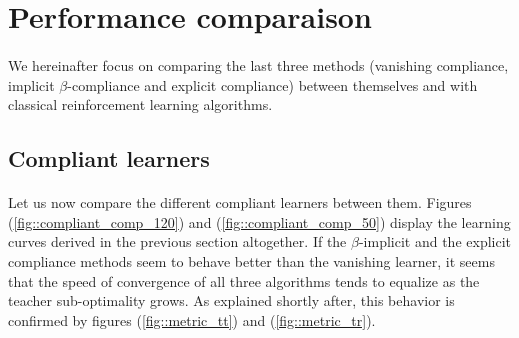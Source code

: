 \documentclass[a4paper]{report}
\begin{document}
{{		\section{Performance comparaison}
		{
			\label{sec_method_comp}
			\paragraph{} We hereinafter focus on comparing the last three methods (vanishing compliance, implicit $\beta$-compliance and explicit compliance) between themselves and with classical reinforcement learning algorithms. 
			
			\subsection{Compliant learners}
			{
				\paragraph{} Let us now compare the different compliant learners between them. Figures (\ref{fig::compliant_comp_120}) and (\ref{fig::compliant_comp_50}) display the learning curves derived in the previous section altogether. If the $\beta$-implicit and the explicit compliance methods seem to behave better than the vanishing learner, it seems that the speed of convergence of all three algorithms tends to equalize as the teacher sub-optimality grows. As explained shortly after, this behavior is confirmed by figures (\ref{fig::metric_tt}) and (\ref{fig::metric_tr}). 
				
}}}}
\end{document}
